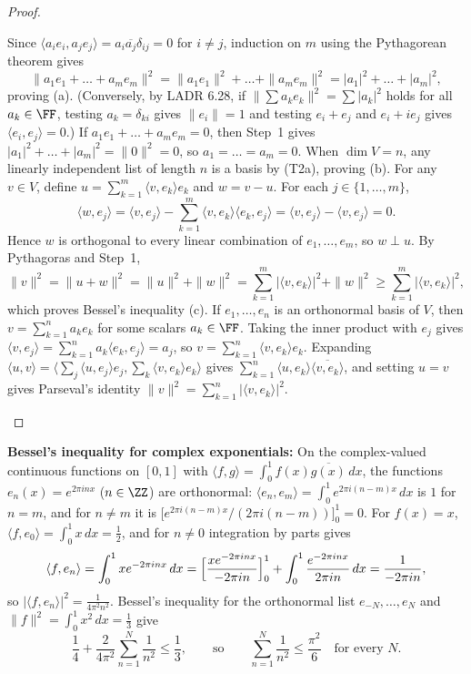 \documentclass[10pt]{scrartcl}
\newcommand{\ip}[2]{\langle #1,#2\rangle}
\begin{document}
\begin{proof}
  \begin{steps}
    \ii Since $\ip{a_ie_i}{a_je_j}=a_i\overline{a_j}\delta_{ij}=0$ for $i\ne j$, induction on $m$ using the Pythagorean theorem gives
    \[ \|a_1e_1+\dots+a_me_m\|^2=\|a_1e_1\|^2+\dots+\|a_me_m\|^2=|a_1|^2+\dots+|a_m|^2, \]
    proving (a). (Conversely, by LADR 6.28, if $\|\sum a_ke_k\|^2=\sum|a_k|^2$ holds for all $a_k\in\FF$, testing $a_k=\delta_{ki}$ gives $\|e_i\|=1$ and testing $e_i+e_j$ and $e_i+ie_j$ gives $\ip{e_i}{e_j}=0$.)
    \ii If $a_1e_1+\dots+a_me_m=0$, then Step~1 gives $|a_1|^2+\dots+|a_m|^2=\|0\|^2=0$, so $a_1=\dots=a_m=0$. When $\dim V=n$, any linearly independent list of length $n$ is a basis by (T2a), proving (b).
    \ii For any $v\in V$, define $u=\sum_{k=1}^m\ip v{e_k}e_k$ and $w=v-u$. For each $j\in\{1,\dots,m\}$,
    \[
      \ip w{e_j} = \ip v{e_j} - \sum_{k=1}^m\ip v{e_k}\ip{e_k}{e_j} = \ip v{e_j} - \ip v{e_j} = 0.
    \]
    Hence $w$ is orthogonal to every linear combination of $e_1,\dots,e_m$, so $w\perp u$. By Pythagoras and Step~1,
    \[
      \|v\|^2 = \|u+w\|^2 = \|u\|^2 + \|w\|^2 = \sum_{k=1}^m |\ip v{e_k}|^2 + \|w\|^2 \ge \sum_{k=1}^m |\ip v{e_k}|^2,
    \]
    which proves Bessel's inequality (c).
    \ii If $e_1,\dots,e_n$ is an orthonormal basis of $V$, then $v=\sum_{k=1}^n a_ke_k$ for some scalars $a_k\in\FF$. Taking the inner product with $e_j$ gives $\ip v{e_j}=\sum_{k=1}^n a_k\ip{e_k}{e_j}=a_j$, so $v=\sum_{k=1}^n\ip v{e_k}e_k$. Expanding $\ip uv=\ip{\sum_j\ip u{e_j}e_j}{\sum_k\ip v{e_k}e_k}$ gives $\sum_{k=1}^n\ip u{e_k}\overline{\ip v{e_k}}$, and setting $u=v$ gives Parseval's identity $\|v\|^2=\sum_{k=1}^n|\ip v{e_k}|^2$.
  \end{steps}
\end{proof}

\begin{itemize}
  \ii \textbf{Bessel's inequality for complex exponentials:} On the complex-valued continuous functions on $[0,1]$ with $\ip fg=\int_0^1 f(x)\overline{g(x)}\,dx$, the functions $e_n(x)=e^{2\pi i nx}$ ($n\in\ZZ$) are orthonormal: $\ip{e_n}{e_m}=\int_0^1e^{2\pi i(n-m)x}\,dx$ is $1$ for $n=m$, and for $n\ne m$ it is $\bigl[e^{2\pi i(n-m)x}/(2\pi i(n-m))\bigr]_0^1=0$. For $f(x)=x$, $\ip f{e_0}=\int_0^1x\,dx=\frac12$, and for $n\ne0$ integration by parts gives
  \[ \ip f{e_n}=\int_0^1xe^{-2\pi inx}\,dx=\Bigl[\frac{xe^{-2\pi inx}}{-2\pi in}\Bigr]_0^1+\int_0^1\frac{e^{-2\pi inx}}{2\pi in}\,dx=\frac{1}{-2\pi in}, \]
  so $|\ip f{e_n}|^2=\frac1{4\pi^2n^2}$. Bessel's inequality for the orthonormal list $e_{-N},\dots,e_N$ and $\|f\|^2=\int_0^1x^2\,dx=\frac13$ give
  \[ \frac14+\frac{2}{4\pi^2}\sum_{n=1}^N\frac1{n^2}\le\frac13,\qquad\text{so}\qquad\sum_{n=1}^N\frac1{n^2}\le\frac{\pi^2}6\quad\text{for every }N. \]
\end{itemize}
\end{document}
